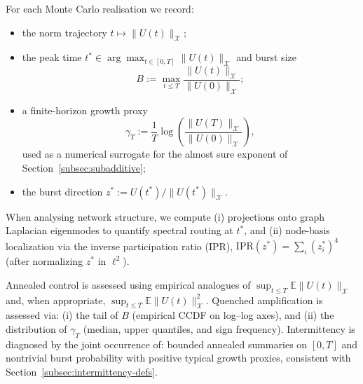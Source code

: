 \documentclass[12pt,a4paper]{article}
\theoremstyle{plain}
\theoremstyle{definition}
\theoremstyle{remark}
\begin{document}
For each Monte Carlo realisation we record:
\begin{itemize}
	\item the norm trajectory $t\mapsto \|U(t)\|_{\mathcal X}$;
	\item the peak time $t^*\in\arg\max_{t\in[0,T]}\|U(t)\|_{\mathcal X}$ and burst size
	\begin{equation}
		B:=\max_{t\le T}\frac{\|U(t)\|_{\mathcal X}}{\|U(0)\|_{\mathcal X}};
		\label{eq:num-burst}
	\end{equation}
	\item a finite-horizon growth proxy
	\begin{equation}
		\gamma_T:=\frac{1}{T}\log\!\left(\frac{\|U(T)\|_{\mathcal X}}{\|U(0)\|_{\mathcal X}}\right),
		\label{eq:num-gammat}
	\end{equation}
	used as a numerical surrogate for the almost sure exponent of Section~\ref{subsec:subadditive};
	\item the burst direction $z^*:=U(t^*)/\|U(t^*)\|_{\mathcal X}$.
\end{itemize}

When analysing network structure, we compute (i) projections onto graph Laplacian eigenmodes to quantify spectral routing at $t^*$,
and (ii) node-basis localization via the inverse participation ratio (IPR),
$\mathrm{IPR}(z^*)=\sum_i (z_i^*)^4$ (after normalizing $z^*$ in $\ell^2$).

Annealed control is assessed using empirical analogues of
$\sup_{t\le T}\mathbb E\|U(t)\|_{\mathcal X}$ and, when appropriate,
$\sup_{t\le T}\mathbb E\|U(t)\|_{\mathcal X}^2$.
Quenched amplification is assessed via:
(i) the tail of $B$ (empirical CCDF on log--log axes), and
(ii) the distribution of $\gamma_T$ (median, upper quantiles, and sign frequency).
Intermittency is diagnosed by the joint occurrence of: bounded annealed summaries on $[0,T]$ and nontrivial burst probability with
positive typical growth proxies, consistent with Section~\ref{subsec:intermittency-defs}.
\end{document}
